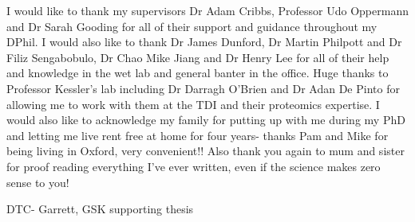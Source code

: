 I would like to thank my supervisors Dr Adam Cribbs, Professor Udo Oppermann and Dr Sarah Gooding for all of their support and guidance throughout my DPhil. I would also like to thank Dr James Dunford, Dr Martin Philpott and Dr Filiz Sengabobulo, Dr Chao Mike Jiang and Dr Henry Lee for all of their help and knowledge in the wet lab and general banter in the office. Huge thanks to Professor Kessler's lab including Dr Darragh O'Brien and Dr Adan De Pinto for allowing me to work with them at the TDI and their proteomics expertise.
I would also like to acknowledge my family for putting up with me during my PhD and letting me live rent free at home for four years- thanks Pam and Mike for being living in Oxford, very convenient!! Also thank you again to mum and sister for proof reading everything I've ever written, even if the science makes zero sense to you!

DTC- Garrett, GSK supporting thesis
